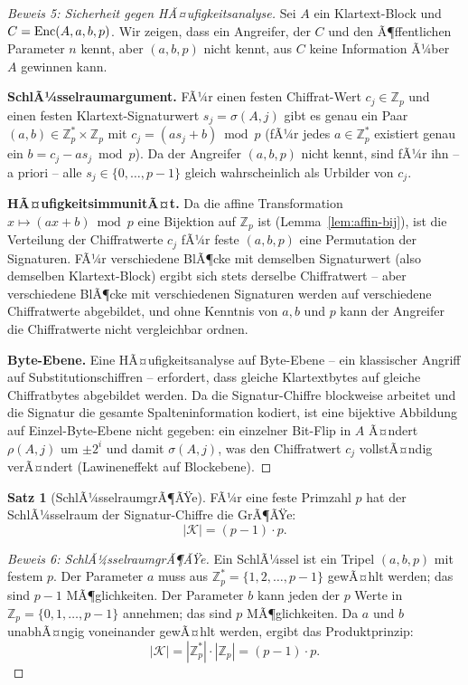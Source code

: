 ﻿\documentclass[a4paper,12pt]{scrreprt}
\theoremstyle{definition}
\newtheorem{satz}{Satz}[section]
\begin{document}
\begin{proof}[Beweis 5: Sicherheit gegen HÃ¤ufigkeitsanalyse]
	Sei $A$ ein Klartext-Block und $C = \mathrm{Enc}(A, \newline a, b, p)$. Wir zeigen, dass ein Angreifer, der $C$ und den Ã¶ffentlichen Parameter $n$ kennt, aber $(a, b, p)$ nicht kennt, aus $C$ keine Information Ã¼ber $A$ gewinnen kann.
	
	\textbf{SchlÃ¼sselraumargument.} FÃ¼r einen festen Chiffrat-Wert $c_j \in \mathbb{Z}_p$ und einen festen Klartext-Signaturwert $s_j = \sigma(A,j)$ gibt es genau ein Paar $(a, b) \in \mathbb{Z}_p^* \times \mathbb{Z}_p$ mit $c_j = (a s_j + b) \bmod p$ (fÃ¼r jedes $a \in \mathbb{Z}_p^*$ existiert genau ein $b = c_j - a s_j \bmod p$). Da der Angreifer $(a, b, p)$ nicht kennt, sind fÃ¼r ihn -- a priori -- alle $s_j \in \{0, \ldots, p-1\}$ gleich wahrscheinlich als Urbilder von $c_j$.
	
	\textbf{HÃ¤ufigkeitsimmunitÃ¤t.} Da die affine Transformation $x \mapsto (ax + b) \bmod p$ eine Bijektion auf $\mathbb{Z}_p$ ist (Lemma~\ref{lem:affin-bij}), ist die Verteilung der Chiffratwerte $c_j$ fÃ¼r feste $(a, b, p)$ eine Permutation der Signaturen. FÃ¼r verschiedene BlÃ¶cke mit demselben Signaturwert (also demselben Klartext-Block) ergibt sich stets derselbe Chiffratwert -- aber verschiedene BlÃ¶cke mit verschiedenen Signaturen werden auf verschiedene Chiffratwerte abgebildet, und ohne Kenntnis von $a, b$ und $p$ kann der Angreifer die Chiffratwerte nicht vergleichbar ordnen.
	
	\textbf{Byte-Ebene.} Eine HÃ¤ufigkeitsanalyse auf Byte-Ebene -- ein klassischer Angriff auf Substitutionschiffren -- erfordert, dass gleiche Klartextbytes auf gleiche Chiffratbytes abgebildet werden. Da die Signatur-Chiffre blockweise arbeitet und die Signatur die gesamte Spalteninformation kodiert, ist eine bijektive Abbildung auf Einzel-Byte-Ebene nicht gegeben: ein einzelner Bit-Flip in $A$ Ã¤ndert $\rho(A,j)$ um $\pm 2^i$ und damit $\sigma(A,j)$, was den Chiffratwert $c_j$ vollstÃ¤ndig verÃ¤ndert (Lawineneffekt auf Blockebene).
\end{proof}

\begin{satz}[SchlÃ¼sselraumgrÃ¶ÃŸe]
	\label{satz:schluessel}
	FÃ¼r eine feste Primzahl $p$ hat der SchlÃ¼sselraum der Signatur-Chiffre die GrÃ¶ÃŸe:
	\[
	|\mathcal{K}| = (p-1) \cdot p.
	\]
\end{satz}

\begin{proof}[Beweis 6: SchlÃ¼sselraumgrÃ¶ÃŸe]
	Ein SchlÃ¼ssel ist ein Tripel $(a, b, p)$ mit festem $p$. Der Parameter $a$ muss aus $\mathbb{Z}_p^* = \{1, 2, \ldots, p-1\}$ gewÃ¤hlt werden; das sind $p - 1$ MÃ¶glichkeiten. Der Parameter $b$ kann jeden der $p$ Werte in $\mathbb{Z}_p = \{0, 1, \ldots, p-1\}$ annehmen; das sind $p$ MÃ¶glichkeiten. Da $a$ und $b$ unabhÃ¤ngig voneinander gewÃ¤hlt werden, ergibt das Produktprinzip:
	\[
	|\mathcal{K}| = |\mathbb{Z}_p^*| \cdot |\mathbb{Z}_p| = (p-1) \cdot p.
	\]
\end{proof}
\end{document}
